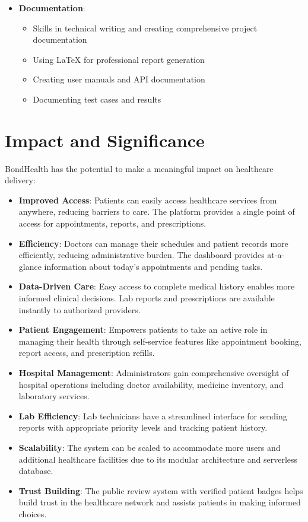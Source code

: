 \begin{itemize}
    \item \textbf{Documentation}:
    \begin{itemize}
        \item Skills in technical writing and creating comprehensive project documentation
        \item Using LaTeX for professional report generation
        \item Creating user manuals and API documentation
        \item Documenting test cases and results
    \end{itemize}
\end{itemize}

\section{Impact and Significance}
BondHealth has the potential to make a meaningful impact on healthcare delivery:

\begin{itemize}
    \item \textbf{Improved Access}: Patients can easily access healthcare services from anywhere, reducing barriers to care. The platform provides a single point of access for appointments, reports, and prescriptions.
    
    \item \textbf{Efficiency}: Doctors can manage their schedules and patient records more efficiently, reducing administrative burden. The dashboard provides at-a-glance information about today's appointments and pending tasks.
    
    \item \textbf{Data-Driven Care}: Easy access to complete medical history enables more informed clinical decisions. Lab reports and prescriptions are available instantly to authorized providers.
    
    \item \textbf{Patient Engagement}: Empowers patients to take an active role in managing their health through self-service features like appointment booking, report access, and prescription refills.
    
    \item \textbf{Hospital Management}: Administrators gain comprehensive oversight of hospital operations including doctor availability, medicine inventory, and laboratory services.
    
    \item \textbf{Lab Efficiency}: Lab technicians have a streamlined interface for sending reports with appropriate priority levels and tracking patient history.
    
    \item \textbf{Scalability}: The system can be scaled to accommodate more users and additional healthcare facilities due to its modular architecture and serverless database.
    
    \item \textbf{Trust Building}: The public review system with verified patient badges helps build trust in the healthcare network and assists patients in making informed choices.
\end{itemize}

